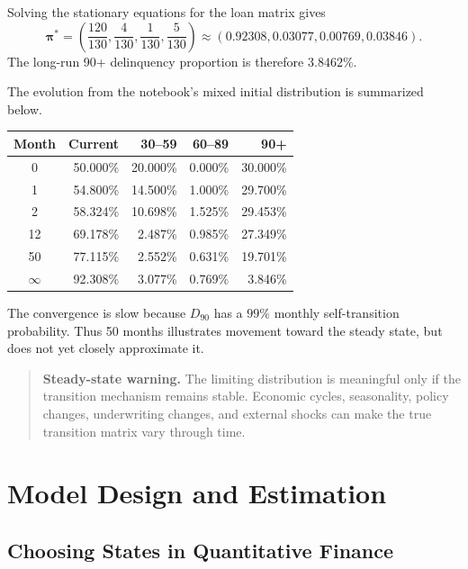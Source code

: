 \documentclass[12pt,openany]{book}
\theoremstyle{definition}
\theoremstyle{remark}
\begin{document}
Solving the stationary equations for the loan matrix gives
\[
\boldsymbol{\pi}^{*}
=\left(
\frac{120}{130},
\frac{4}{130},
\frac{1}{130},
\frac{5}{130}
\right)
\approx
(0.92308,0.03077,0.00769,0.03846).
\]
The long-run 90+ delinquency proportion is therefore \(3.8462\%\).

The evolution from the notebook's mixed initial distribution is summarized
below.

\begin{center}
\begin{tabular}{crrrr}
\toprule
\textbf{Month} & \textbf{Current} & \textbf{30--59} &
\textbf{60--89} & \textbf{90+} \\
\midrule
0 & 50.000\% & 20.000\% & 0.000\% & 30.000\% \\
1 & 54.800\% & 14.500\% & 1.000\% & 29.700\% \\
2 & 58.324\% & 10.698\% & 1.525\% & 29.453\% \\
12 & 69.178\% & 2.487\% & 0.985\% & 27.349\% \\
50 & 77.115\% & 2.552\% & 0.631\% & 19.701\% \\
\(\infty\) & 92.308\% & 3.077\% & 0.769\% & 3.846\% \\
\bottomrule
\end{tabular}
\end{center}

The convergence is slow because \(D_{90}\) has a \(99\%\) monthly
self-transition probability. Thus 50 months illustrates movement toward the
steady state, but does not yet closely approximate it.

\begin{quote}
\colorbox{diagramOrange!12}{%
\parbox{\dimexpr\linewidth-2\fboxsep\relax}{%
\textbf{Steady-state warning.} The limiting distribution is meaningful only
if the transition mechanism remains stable. Economic cycles, seasonality,
policy changes, underwriting changes, and external shocks can make the true
transition matrix vary through time.}}
\end{quote}

\section{Model Design and Estimation}

\subsection{Choosing States in Quantitative Finance}
\end{document}
